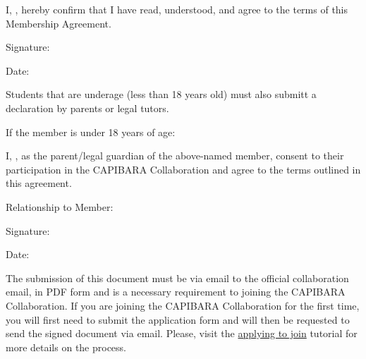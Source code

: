 \documentclass[11pt,a4paper]{article}
\begin{document}
\vspace{1em}
I, \underline{\hspace{10cm}},  hereby confirm that I have read, understood, and agree to the terms of this Membership Agreement.

\vspace{1em}
Signature: \underline{\hspace{10cm}}

\vspace{1em}
Date: \underline{\hspace{10cm}}

\vspace{1em}
Students that are underage (less than 18 years old) must also submitt a declaration by parents or legal tutors.

\vspace{1em}
If the member is under 18 years of age:

\vspace{1em}
I, \underline{\hspace{10cm}}, as the parent/legal guardian of the above-named member, consent to their participation in the CAPIBARA Collaboration and agree to the terms outlined in this agreement.

\vspace{1em}
Relationship to Member: \underline{\hspace{10cm}}

\vspace{1em}
Signature: \underline{\hspace{10cm}}

\vspace{1em}
Date: \underline{\hspace{10cm}}

\vspace{5em}
\hrulefill
\vspace{1em}

The submission of this document must be via email to the official collaboration email, in PDF form and is a necessary requirement to joining the CAPIBARA Collaboration. If you are joining the CAPIBARA Collaboration for the first time, you will first need to submit the application form and will then be requested to send the signed document via email. Please, visit the \href{https://capibara3.github.io/docs/public/onboarding/00_applying_to_join.html}{applying to join} tutorial for more details on the process.
\end{document}
